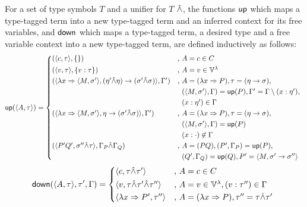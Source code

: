 \documentclass[main.tex]{subfiles}
\begin{document}
\begin{defn}
    \label{def:propagation}
    For a set of type symbols $T$ and a unifier for $T$ $\hat{\wedge}$, the functions
    $\mathsf{up}$ which maps a type-tagged term into a new type-tagged term and
    an inferred context for its free variables, and $\mathsf{down}$ which maps
    a type-tagged term, a desired type and a free variable context into a
    new type-tagged term, are defined inductively as follows:
    \[
        \mcf{up}(\ttt{A}{\tau}) =
        \begin{cases*}
            (\ttt{c}{\tau}, \{ \}) &, $A = c \in C$ \\
            (\ttt{v}{\tau}, \{ v : \tau \}) &, $A = v \in \lvars$ \\
            (\ttt{\lambda x \abstr \ttt{M}{\sigma'}}{(\eta' \unify \eta) \tot (\sigma' \unify \sigma)}, \Gamma')
                &, $A = (\lambda x \abstr P)
                , \tau = (\eta \tot \sigma),$ \\
                \phantom{} &\phantom{, }$(\ttt{M}{\sigma'}, \Gamma) = \mcf{up}(P)
                , \Gamma' = \Gamma \setminus (x : \eta'),$ \\
                \phantom{} &\phantom{, }$(x : \eta') \in \Gamma$ \\
            (\ttt{\lambda x \abstr \ttt{M}{\sigma'}}{\eta \tot (\sigma' \unify \sigma)}, \Gamma')
                &, $A = (\lambda x \abstr P)
                , \tau = (\eta \tot \sigma),$ \\
                \phantom{} &\phantom{, }$(\ttt{M}{\sigma'}, \Gamma) = \mcf{up}(P)$ \\
                \phantom{} &\phantom{, }$(x : \cdot) \not\in \Gamma$ \\
            (\ttt{P' Q'}{\sigma'' \unify \tau}, \Gamma_P \unify \Gamma_Q)
                &, $A = (PQ), (P', \Gamma_P) = \mcf{up}(P),$ \\
                \phantom{} &\phantom{, }$(Q', \Gamma_Q) = \mcf{up}(Q), P' = \ttt{M}{\sigma' \tot \sigma''}$ \\
        \end{cases*}
    \]
    \[
        \mcf{down}(\ttt{A}{\tau}, \tau', \Gamma) =
        \begin{cases*}
            \ttt{c}{\tau \unify \tau'} &, $A = c \in C$ \\
            \ttt{v}{\tau \unify \tau' \unify \tau''}
                &, $A = v \in \lvars, (v : \tau'') \in \Gamma$ \\
            \ttt{\lambda x \abstr P'}{\tau''}
                &, $A = (\lambda x \abstr P), \tau'' = \tau \unify \tau'$ \\

\end{cases*}\]
\end{defn}
\end{document}
